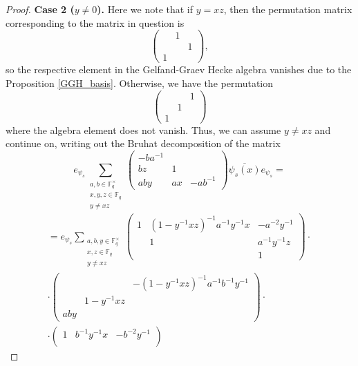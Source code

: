 \documentclass[12pt,reqno]{amsart}
\theoremstyle{definition}
\theoremstyle{remark}
\numberwithin{equation}{section}
\begin{document}
\begin{proof}
    \textbf{Case 2 ($y \ne 0$).} Here we note that if $y = xz$, then the permutation matrix corresponding to the matrix in question is
    \[\begin{pmatrix}
        & 1 & \\
        & & 1 \\
        1 & &
    \end{pmatrix},
    \]
    so the respective element in the Gelfand-Graev Hecke algebra vanishes due to the Proposition \ref{GGH_basis}. Otherwise, we have the permutation 
    \[\begin{pmatrix}
        & & 1\\
        & 1 & \\
        1 & &
    \end{pmatrix}\]
    where the algebra element does not vanish. Thus, we can assume $y \ne xz$ and continue on, writing out the Bruhat decomposition of the matrix
    \begin{equation*}
        e_{\psi_s}\sum_{\substack{a, b \in \mathbb{F}_q^\times\\x, y, z \in \mathbb{F}_q\\y \ne xz}}\begin{pmatrix}
        -ba^{-1} & &\\
        bz & 1 & \\
        aby & ax & -ab^{-1}
    \end{pmatrix} \overline{\psi_s(x)} e_{\psi_s} =
    \end{equation*}
    \begin{align*}
    = e_{\psi_s}\sum_{\substack{a, b, y \in \mathbb{F}_q^\times\\x, z \in \mathbb{F}_q\\ y \ne xz}} \begin{pmatrix}
        1 & (1-y^{-1}xz)^{-1}a^{-1}y^{-1}x & -a^{-2}y^{-1}\\
        & 1 & a^{-1}y^{-1}z\\
        & & 1
    \end{pmatrix}\cdot \\ \cdot \begin{pmatrix}
        & & -(1-y^{-1}xz)^{-1}a^{-1}b^{-1}y^{-1}\\
        & 1-y^{-1}xz &\\
        aby & &
    \end{pmatrix} \cdot \\ \cdot \begin{pmatrix}
        1 & b^{-1}y^{-1}x & -b^{-2}y^{-1}\\

\end{pmatrix}
\end{align*}
\end{proof}
\end{document}
